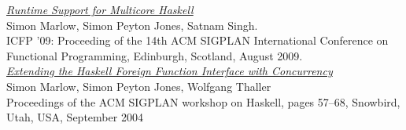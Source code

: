 \documentclass[10pt, oneside]{article}
\begin{document}
\begin{thebibliography}{9}
  \newblock \href{http://community.haskell.org/~simonmar/papers/multicore-ghc.pdf}{\emph{Runtime
      Support for Multicore Haskell}}\\
  \newblock Simon Marlow, Simon Peyton Jones, Satnam Singh.\\
  \newblock ICFP '09: Proceeding of the 14th ACM SIGPLAN International
  Conference on Functional Programming, Edinburgh, Scotland, August 2009.\\

  \newblock \href{http://community.haskell.org/~simonmar/papers/conc-ffi.pdf}{\emph{Extending
      the Haskell Foreign Function Interface with Concurrency}}\\
  \newblock Simon Marlow, Simon Peyton Jones, Wolfgang Thaller\\
  \newblock Proceedings of the ACM SIGPLAN workshop on Haskell, pages 57--68, Snowbird, Utah, USA, September 2004\\

\end{thebibliography}
\end{document}
